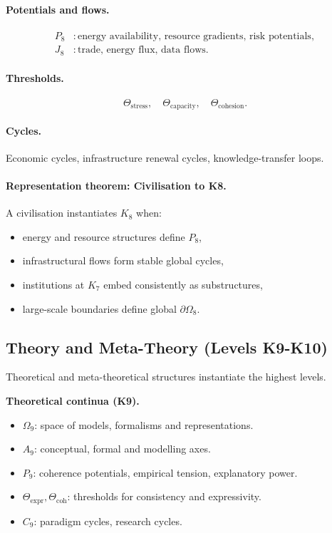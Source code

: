 \paragraph{Potentials and flows.}
\[
\begin{aligned}
  P_8 &: \text{energy availability, resource gradients, risk potentials},\\
  J_8 &: \text{trade, energy flux, data flows}.
\end{aligned}
\]

\paragraph{Thresholds.}
\[
  \Theta_{\mathrm{stress}},\quad
  \Theta_{\mathrm{capacity}},\quad
  \Theta_{\mathrm{cohesion}}.
\]

\paragraph{Cycles.}
Economic cycles, infrastructure renewal cycles, knowledge-transfer loops.

\paragraph{Representation theorem: Civilisation to K8.}
A civilisation instantiates \(K_8\) when:
\begin{itemize}
  \item energy and resource structures define \(P_8\),
  \item infrastructural flows form stable global cycles,
  \item institutions at \(K_7\) embed consistently as substructures,
  \item large-scale boundaries define global \(\partial\Omega_8\).
\end{itemize}

\subsection{Theory and Meta-Theory (Levels K9-K10)}

Theoretical and meta-theoretical structures instantiate the highest levels.

\medskip\noindent\textbf{Theoretical continua (K9).}
\begin{itemize}
  \item \(\Omega_9\): space of models, formalisms and representations.
  \item \(A_9\): conceptual, formal and modelling axes.
  \item \(P_9\): coherence potentials, empirical tension, explanatory power.
  \item \(\Theta_{\mathrm{expr}}, \Theta_{\mathrm{coh}}\): thresholds for
        consistency and expressivity.
  \item \(C_9\): paradigm cycles, research cycles.
\end{itemize}

